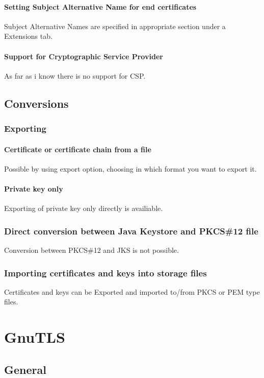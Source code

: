 \documentclass[10pt, a4paper]{report}
\begin{document}
    \subsubsection{Setting Subject Alternative Name for end certificates}
Subject Alternative Names are specified in appropriate section under a Extensions tab.
    \subsubsection{Support for Cryptographic Service Provider}
As far as i know there is no support for CSP.
\section{Conversions}

  \subsection{Exporting}
  
    \subsubsection{Certificate or certificate chain from a file}
Possible by using export option, choosing in which format you want to export it.
    \subsubsection{Private key only}
Exporting of private key only directly is availiable.
  \subsection{Direct conversion between Java Keystore and PKCS\#12 file}
Conversion between PKCS\#12 and JKS is not possible.
  \subsection{Importing certificates and keys into storage files}
Certificates and keys can be Exported and imported to/from PKCS or PEM type files.

\chapter{GnuTLS}

\section{General}
\end{document}

